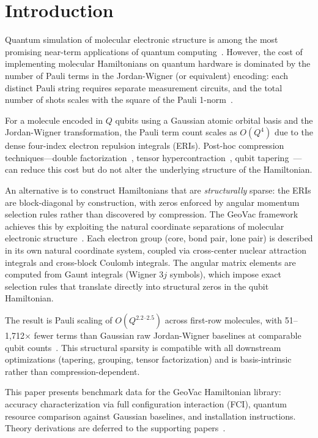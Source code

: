 \documentclass[twocolumn,pra,amsmath,amssymb,superscriptaddress]{revtex4-2}
\begin{document}
\section{Introduction}
\label{sec:intro}

Quantum simulation of molecular electronic structure is among the most
promising near-term applications of quantum computing~\cite{McArdle2020,
Bauer2020,Cao2019}. However, the cost of implementing molecular Hamiltonians
on quantum hardware is dominated by the number of Pauli terms in the
Jordan-Wigner (or equivalent) encoding: each distinct Pauli string requires
separate measurement circuits, and the total number of shots scales with
the square of the Pauli 1-norm~\cite{Wecker2015,Rubin2018}.

For a molecule encoded in $Q$ qubits using a Gaussian atomic orbital basis
and the Jordan-Wigner transformation, the Pauli term count scales as
$O(Q^4)$ due to the dense four-index electron repulsion integrals (ERIs).
Post-hoc compression techniques---double factorization~\cite{vonBurg2021},
tensor hypercontraction~\cite{Lee2021}, qubit tapering~\cite{Bravyi2017}---can
reduce this cost but do not alter the underlying structure of the Hamiltonian.

An alternative is to construct Hamiltonians that are \emph{structurally}
sparse: the ERIs are block-diagonal by construction, with zeros enforced
by angular momentum selection rules rather than discovered by compression.
The GeoVac framework achieves this by exploiting the natural coordinate
separations of molecular electronic structure~\cite{GeoVac_Paper7,
GeoVac_Paper14,GeoVac_Paper17,GeoVac_Paper19}. Each electron group
(core, bond pair, lone pair) is described in its own natural coordinate
system, coupled via cross-center nuclear attraction integrals and
cross-block Coulomb integrals.  The angular matrix elements are computed
from Gaunt integrals (Wigner 3$j$ symbols), which impose exact selection
rules that translate directly into structural zeros in the qubit Hamiltonian.

The result is Pauli scaling of $O(Q^{2.2\text{--}2.5})$ across first-row
molecules, with 51--1{,}712$\times$ fewer terms than Gaussian raw
Jordan-Wigner baselines at comparable qubit counts~\cite{GeoVac_Paper14}.
This structural sparsity is compatible with all downstream optimizations
(tapering, grouping, tensor factorization) and is basis-intrinsic rather
than compression-dependent.

This paper presents benchmark data for the GeoVac Hamiltonian library:
accuracy characterization via full configuration interaction (FCI),
quantum resource comparison against Gaussian baselines, and installation
instructions.  Theory derivations are deferred to the supporting
papers~\cite{GeoVac_Paper7,GeoVac_Paper14,GeoVac_Paper17,GeoVac_Paper19}.
\end{document}
